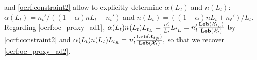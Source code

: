 %
 and \cref{ocrf:constraint2} allow to explicitly
determine $\alpha(L_t)$ and $n(L_t)$: $\alpha(L_t) = n_t'/\left((1-\alpha)nL_t
+ n_t'\right)$ and $n(L_t) = \left((1-\alpha)nL_t + n_t'\right)/L_t$.
Regarding \cref{ocrf:oc_proxy_ad1}, $\alpha(L_t) n(L_t)  L_{t_L} =
\frac{n_t'}{L_t} L_{t_L} =
n_t'\frac{\mathbf{Leb}(\mathcal{X}_{t_L})}{\mathbf{Leb}(\mathcal{X}_{t})}$ by
\cref{ocrf:constraint2} and $\alpha(L_t) n(L_t) L_{t_R}  =
n_t'\frac{\mathbf{Leb}(\mathcal{X}_{t_R})}{\mathbf{Leb}(\mathcal{X}_{t})},$ so that we recover
\cref{ocrf:oc_proxy_ad2}.




